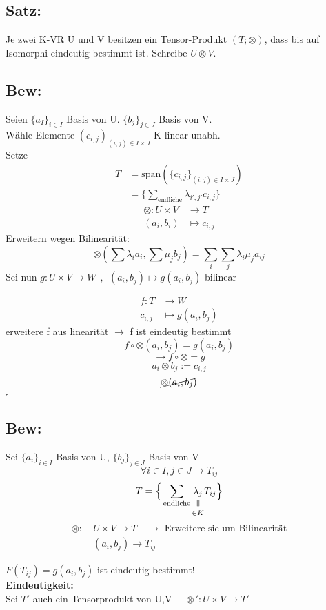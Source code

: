 \documentclass[titlepage,12pt,a4paper,ngerman]{report}
\newenvironment{bew}[1]{\subsection{Bew: #1}}{\hfill$\square$}
\newcommand{\Bew}[2]{\begin{bew}{#1}#2\end{bew}}
\newcommand{\verteq}{\rotatebox{90}{$\,=$}}
\newcommand{\equalto}[2]{\underset{\scriptstyle\overset{\mkern4mu\verteq}{#2}}{#1}}
\newcommand{\tx}[1]{\textrm{#1}}
\newcommand{\spa}{\tx{span}}
\begin{document}
\subsection{Satz:}
Je zwei K-VR U und V besitzen ein Tensor-Produkt $ (T;\otimes) $, dass bis auf Isomorphi eindeutig bestimmt ist. Schreibe $ U \otimes V $.
\Bew{}{
Seien $ \{a_I\}_{i \in I} $ Basis von U. $ \{b_j\}_{j\in J} $ Basis von V.\\
Wähle Elemente $ (c_{i,j})_{(i,j) \in I \times J} $ K-linear unabh.\\[5pt]
Setze 
\begin{align*}
T &= \spa(\{c_{i,j}\}_{(i,j) \in I \times J})\\
&= \bigg\{ \sum_{\tx{endliche}} \lambda_{i',j'} c_{i,j} \bigg\}
\end{align*}
\begin{align*}
\otimes : U \times V &\to T\\
(a_i,b_i) &\mapsto c_{i,j}
\end{align*}
Erweitern wegen Bilinearität:
$$\otimes (\sum \lambda_i a_i, \sum \mu_j b_j) = \sum_i \sum_j \lambda_i \mu_j a_{ij}$$
Sei nun $ g: U \times V \to W \ \ , \ \ (a_i,b_j) \mapsto g(a_i,b_j) $ bilinear

\begin{align*}
f: T & \to W\\c_{i,j} &\mapsto g(a_i,b_j)
\end{align*}
erweitere f aus \underline{linearität} $ \rightarrow $ f ist eindeutig \underline{bestimmt}
$$f \circ \otimes (a_i,b_j) = g(a_i,b_j)$$
$$ \rightarrow f \circ \otimes = g$$
$$ a_i \otimes b_j := c_{i,j}$$
$$\cancel{\otimes (a_i,b_j)} $$
}


\subsection{Bew:} 
Sei $ \{a_i\}_{i\in I} $ Basis von U, $ \{b_j\}_{j \in J} $ Basis von V
$$\forall i \in I , j \in J \rightarrow T_{ij}$$
$$T = \Big\{ \sum_{\tx{endliche}} \equalto{\lambda_j}{\in K} T_{ij} \Big\}$$
\begin{align*}
\otimes : \  & U \times V \to T \quad \rightarrow \tx{ Erweitere sie um Bilinearität}\\
& (a_i,b_j) \to T_{ij}
\end{align*}


$ F(T_{ij}) = g(a_i,b_j) $ ist eindeutig bestimmt!\\[10pt]
\textbf{Eindeutigkeit:}\\
Sei  $ T' $ auch ein Tensorprodukt von U,V $\quad \otimes ' : U \times V \to T' $
\end{document}
